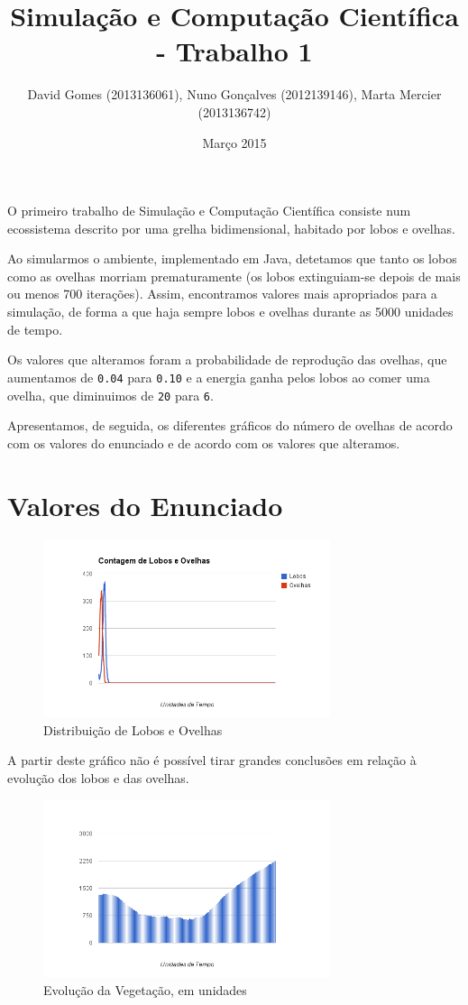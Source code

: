 \documentclass[12pt]{article}
\title{Simulação e Computação Científica - Trabalho 1}
\author{David Gomes (2013136061), Nuno Gonçalves (2012139146), Marta Mercier (2013136742)}
\date{Março 2015}
\begin{document}
\maketitle

O primeiro trabalho de Simulação e Computação Científica consiste num ecossistema
descrito por uma grelha bidimensional, habitado por lobos e ovelhas.

Ao simularmos o ambiente, implementado em Java, detetamos que tanto os lobos como
as ovelhas morriam prematuramente (os lobos extinguiam-se depois de mais ou menos
700 iterações). Assim, encontramos valores mais apropriados para a simulação, de
forma a que haja sempre lobos e ovelhas durante as 5000 unidades de tempo.

Os valores que alteramos foram a probabilidade de reprodução das ovelhas, que aumentamos
de \texttt{0.04} para \texttt{0.10} e a energia ganha pelos lobos ao comer uma ovelha, que
diminuimos de \texttt{20} para \texttt{6}.

Apresentamos, de seguida, os diferentes gráficos do número de ovelhas de acordo com os valores do
enunciado e de acordo com os valores que alteramos.

\section{Valores do Enunciado}

\begin{figure}[H]
  \centering
  \includegraphics[width=0.75\textwidth]{ovelhaslobos1}
  \caption{Distribuição de Lobos e Ovelhas}
\end{figure}

A partir deste gráfico não é possível tirar grandes conclusões em relação
à evolução dos lobos e das ovelhas.

\begin{figure}[H]
  \centering
  \includegraphics[width=0.75\textwidth]{vegetacao1}
  \caption{Evolução da Vegetação, em unidades}
\end{figure}
\end{document}
